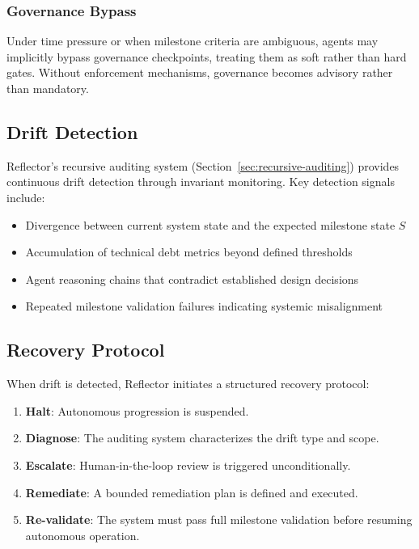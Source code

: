 \subsubsection{Governance Bypass}
Under time pressure or when milestone criteria are ambiguous, agents may implicitly
bypass governance checkpoints, treating them as soft rather than hard gates. Without
enforcement mechanisms, governance becomes advisory rather than mandatory.

\subsection{Drift Detection}

Reflector's recursive auditing system (Section~\ref{sec:recursive-auditing}) provides
continuous drift detection through invariant monitoring. Key detection signals include:

\begin{itemize}
  \item Divergence between current system state and the expected milestone state $S$
  \item Accumulation of technical debt metrics beyond defined thresholds
  \item Agent reasoning chains that contradict established design decisions
  \item Repeated milestone validation failures indicating systemic misalignment
\end{itemize}

\subsection{Recovery Protocol}

When drift is detected, Reflector initiates a structured recovery protocol:

\begin{enumerate}
  \item \textbf{Halt}: Autonomous progression is suspended.
  \item \textbf{Diagnose}: The auditing system characterizes the drift type and scope.
  \item \textbf{Escalate}: Human-in-the-loop review is triggered unconditionally.
  \item \textbf{Remediate}: A bounded remediation plan is defined and executed.
  \item \textbf{Re-validate}: The system must pass full milestone validation before
    resuming autonomous operation.
\end{enumerate}

